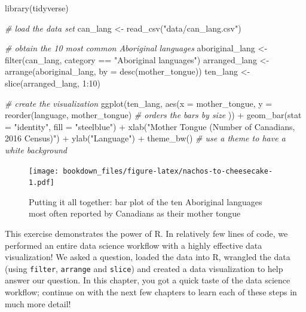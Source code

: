 \documentclass[
  12pt,
]{krantz}
\newenvironment{Shaded}{\begin{snugshade}}{\end{snugshade}}
\newcommand{\AttributeTok}[1]{\textcolor[rgb]{0.61,0.61,0.61}{#1}}
\newcommand{\CommentTok}[1]{\textcolor[rgb]{0.37,0.37,0.37}{\textit{#1}}}
\newcommand{\DecValTok}[1]{\textcolor[rgb]{0.06,0.06,0.06}{#1}}
\newcommand{\FunctionTok}[1]{\textcolor[rgb]{0,0,0}{#1}}
\newcommand{\NormalTok}[1]{#1}
\newcommand{\OtherTok}[1]{\textcolor[rgb]{0.37,0.37,0.37}{#1}}
\newcommand{\SpecialCharTok}[1]{\textcolor[rgb]{0,0,0}{#1}}
\newcommand{\StringTok}[1]{\textcolor[rgb]{0.5,0.5,0.5}{#1}}
\begin{document}
\begin{Shaded}
\begin{Highlighting}[]
\FunctionTok{library}\NormalTok{(tidyverse)}

\CommentTok{\# load the data set}
\NormalTok{can\_lang }\OtherTok{\textless{}{-}} \FunctionTok{read\_csv}\NormalTok{(}\StringTok{"data/can\_lang.csv"}\NormalTok{)}

\CommentTok{\# obtain the 10 most common Aboriginal languages}
\NormalTok{aboriginal\_lang }\OtherTok{\textless{}{-}} \FunctionTok{filter}\NormalTok{(can\_lang, category }\SpecialCharTok{==} \StringTok{"Aboriginal languages"}\NormalTok{)}
\NormalTok{arranged\_lang }\OtherTok{\textless{}{-}} \FunctionTok{arrange}\NormalTok{(aboriginal\_lang, }\AttributeTok{by =} \FunctionTok{desc}\NormalTok{(mother\_tongue))}
\NormalTok{ten\_lang }\OtherTok{\textless{}{-}} \FunctionTok{slice}\NormalTok{(arranged\_lang, }\DecValTok{1}\SpecialCharTok{:}\DecValTok{10}\NormalTok{)}

\CommentTok{\# create the visualization}
\FunctionTok{ggplot}\NormalTok{(ten\_lang, }\FunctionTok{aes}\NormalTok{(}\AttributeTok{x =}\NormalTok{ mother\_tongue, }\AttributeTok{y =} \FunctionTok{reorder}\NormalTok{(language,}
\NormalTok{  mother\_tongue)  }\CommentTok{\# orders the bars by size}
\NormalTok{)) }\SpecialCharTok{+} \FunctionTok{geom\_bar}\NormalTok{(}\AttributeTok{stat =} \StringTok{"identity"}\NormalTok{,}
  \AttributeTok{fill =} \StringTok{"steelblue"}\NormalTok{) }\SpecialCharTok{+} \FunctionTok{xlab}\NormalTok{(}\StringTok{"Mother Tongue (Number of Canadians, 2016 Census)"}\NormalTok{) }\SpecialCharTok{+}
  \FunctionTok{ylab}\NormalTok{(}\StringTok{"Language"}\NormalTok{) }\SpecialCharTok{+} \FunctionTok{theme\_bw}\NormalTok{()  }\CommentTok{\# use a theme to have a white background}
\end{Highlighting}
\end{Shaded}

\begin{figure}
\centering
\texttt{[image: bookdown\_files/figure-latex/nachos-to-cheesecake-1.pdf]}
\caption{\label{fig:nachos-to-cheesecake}Putting it all together: bar plot of the ten Aboriginal languages most often reported by Canadians as their mother tongue}
\end{figure}

This exercise demonstrates the power of R. In relatively few lines of code, we
performed an entire data science workflow with a highly effective data
visualization! We asked a question, loaded the data into R, wrangled the data
(using \texttt{filter}, \texttt{arrange} and \texttt{slice}) and created a data visualization to
help answer our question. In this chapter, you got a quick taste of the data
science workflow; continue on with the next few chapters to learn each of
these steps in much more detail!
\end{document}
